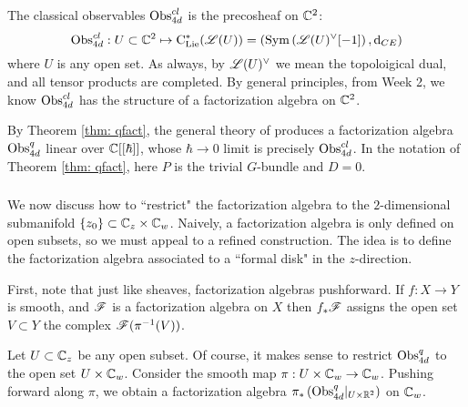 \documentclass[11pt]{amsart}
\begin{document}
The classical observables ${\rm Obs}^{cl}_{4d}$ is the precosheaf on $\mathbb C^2$:
\[
{\rm Obs}^{cl}_{4d} : U \subset \mathbb C^2 \mapsto {\rm C}_{{\rm Lie}}^*(\mathscr L(U)) = \left({\rm Sym} \left(\mathscr L(U)^\vee[-1]\right), {\rm d}_{CE}\right) 
\]
where $U$ is any open set. 
As always, by $\mathscr L(U)^\vee$ we mean the topoloigical dual, and all tensor products are completed. 
By general principles, from Week 2, we know ${\rm Obs}^{cl}_{4d}$ has the structure of a factorization algebra on $\mathbb C^2$. 

By Theorem \ref{thm: qfact}, the general theory of \cite{CG2} produces a factorization algebra ${\rm Obs}^{q}_{4d}$ linear over $\mathbb C[[\hbar]]$, whose $\hbar \to 0$ limit is precisely ${\rm Obs}^{cl}_{4d}$. 
In the notation of Theorem \ref{thm: qfact}, here $P$ is the trivial $G$-bundle and $D = 0$. 

\subsubsection{}

We now discuss how to ``restrict" the factorization algebra to the $2$-dimensional submanifold $\{z_0\} \subset \mathbb C_z \times \mathbb C_w$.
Naively, a factorization algebra is only defined on open subsets, so we must appeal to a refined construction. 
The idea is to define the factorization algebra associated to a ``formal disk" in the $z$-direction. 

First, note that just like sheaves, factorization algebras pushforward.
If $f : X \to Y$ is smooth, and $\mathscr F$ is a factorization algebra on $X$ then $f_* \mathscr F$ assigns the open set $V \subset Y$ the complex $\mathscr F(\pi^{-1}(V))$. 

Let $U \subset \mathbb C_z$ be any open subset.
Of course, it makes sense to restrict ${\rm Obs}^{q}_{4d}$ to the open set $U \times \mathbb C_w$. 
Consider the smooth map $\pi : U \times \mathbb C_w \to \mathbb C_w$. 
Pushing forward along $\pi$, we obtain a factorization algebra $\pi_*\left({\rm Obs}^q_{4d}|_{U \times \mathbb R^2}\right)$ on $\mathbb C_w$. 
\end{document}
